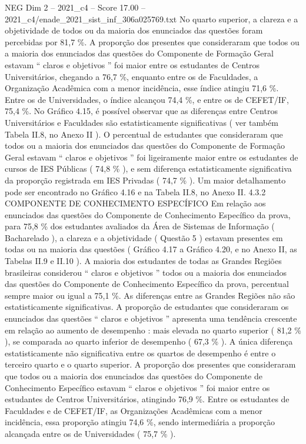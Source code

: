 \begin{textsample}{NEG Dim 2 – 2021\_c4 – Score 17.00 – 2021\_c4/enade\_2021\_sist\_inf\_306a025769.txt}
No quarto superior, a clareza e a objetividade de todos ou da maioria dos enunciados das questões foram percebidas por 81,7 \%.
A proporção dos presentes que consideraram que todos ou a maioria dos enunciados das questões do Componente de Formação Geral estavam “ claros e objetivos ” foi maior entre os estudantes de Centros Universitários, chegando a 76,7 \%, enquanto entre os de Faculdades, a Organização Acadêmica com a menor incidência, esse índice atingiu 71,6 \%.
Entre os de Universidades, o índice alcançou 74,4 \%, e entre os de CEFET/IF, 75,4 \%.
No Gráfico 4.15, é possível observar que as diferenças entre Centros Universitários e Faculdades são estatisticamente significativas ( ver também Tabela II.8, no Anexo II ).
O percentual de estudantes que consideraram que todos ou a maioria dos enunciados das questões do Componente de Formação Geral estavam “ claros e objetivos ” foi ligeiramente maior entre os estudantes de cursos de IES Públicas ( 74,8 \% ), e sem diferença estatisticamente significativa da proporção registrada em IES Privadas ( 74,7 \% ).
Um maior detalhamento pode ser encontrado no Gráfico 4.16 e na Tabela II.8, no Anexo II. 4.3.2 COMPONENTE DE CONHECIMENTO ESPECÍFICO Em relação aos enunciados das questões do Componente de Conhecimento Específico da prova, para 75,8 \% dos estudantes avaliados da Área de Sistemas de Informação ( Bacharelado ), a clareza e a objetividade ( Questão 5 ) estavam presentes em todas ou na maioria das questões ( Gráfico 4.17 a Gráfico 4.20, e no Anexo II, as Tabelas II.9 e II.10 ).
A maioria dos estudantes de todas as Grandes Regiões brasileiras considerou “ claros e objetivos ” todos ou a maioria dos enunciados das questões do Componente de Conhecimento Específico da prova, percentual sempre maior ou igual a 75,1 \%.
As diferenças entre as Grandes Regiões não são estatisticamente significativas.
A proporção de estudantes que consideraram os enunciados das questões “ claros e objetivos ” apresenta uma tendência crescente em relação ao aumento de desempenho : mais elevada no quarto superior ( 81,2 \% ), se comparada ao quarto inferior de desempenho ( 67,3 \% ).
A única diferença estatisticamente não significativa entre os quartos de desempenho é entre o terceiro quarto e o quarto superior.
A proporção dos presentes que consideraram que todos ou a maioria dos enunciados das questões do Componente de Conhecimento Específico estavam “ claros e objetivos ” foi maior entre os estudantes de Centros Universitários, atingindo 76,9 \%.
Entre os estudantes de Faculdades e de CEFET/IF, as Organizações Acadêmicas com a menor incidência, essa proporção atingiu 74,6 \%, sendo intermediária a proporção alcançada entre os de Universidades ( 75,7 \% ).

\end{textsample}
